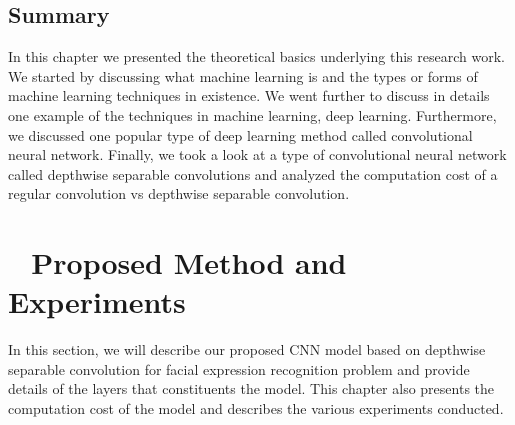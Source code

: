 \documentclass[master]{thesis-uestc}
\begin{document}
\section{Summary}
In this chapter we presented the theoretical basics underlying this research work. We started by discussing what machine learning is and the types or forms of machine learning techniques in existence. We went further to discuss in details one example of the techniques in machine learning, deep learning. Furthermore, we discussed one popular type of deep learning method called convolutional neural network. Finally, we took a look at a type of convolutional neural network called depthwise separable convolutions and analyzed the computation cost of a regular convolution vs depthwise separable convolution.

\chapter{\,\,\,\,\,\textbf{Proposed Method and Experiments}}
In this section, we will describe our proposed CNN model based on depthwise separable convolution for facial expression recognition problem and provide details of the layers that constituents the model. This chapter also presents the computation cost of the model and describes the various experiments conducted.
\end{document}
